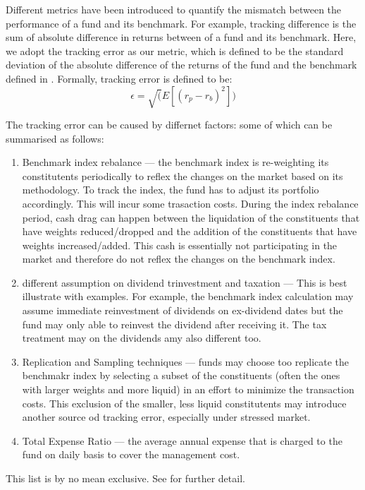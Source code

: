 Different metrics have been introduced to quantify the mismatch between the performance of a fund and its benchmark. For example, tracking difference is the sum of absolute difference in returns between of a fund and its benchmark. Here, we adopt the tracking error as our metric, which is defined to be the standard deviation of the absolute difference of the returns of the fund and the benchmark defined in \cite{ESMA}. Formally, tracking error is defined to be:
\begin{equation}
  \epsilon = \sqrt(E[(r_p - r_b)^2])
\end{equation}

The tracking error can be caused by differnet factors: some of which can be summarised as follows:
\begin{enumerate}
\item Benchmark index rebalance --- the benchmark index is re-weighting its constitutents periodically to reflex the changes on the market based on its methodology. To track the index, the fund has to adjust its portfolio accordingly. This will incur some trasaction costs. During the index rebalance period, cash drag can happen between the liquidation of the constituents that have weights reduced/dropped and the addition of the constituents that have weights increased/added. This cash is essentially not participating in the market and therefore do not reflex the changes on the benchmark index.
\item different assumption on dividend trinvestment and taxation --- This is best illustrate with examples. For example, the benchmark index calculation may assume immediate reinvestment of dividends on ex-dividend dates but the fund may only able to reinvest the dividend after receiving it. The tax treatment may on the dividends amy also different too.
\item Replication and Sampling techniques --- funds may choose too replicate the benchmakr index by selecting a subset of the constituents (often the ones with larger weights and more liquid) in an effort to minimize the transaction costs. This exclusion of the smaller, less liquid constitutents may introduce another source od tracking error, especially under stressed market.
\item Total Expense Ratio --- the average annual expense that is charged to the fund on daily basis to cover the management cost.
\end{enumerate}
This list is by no mean exclusive. See \cite{} for further detail.

